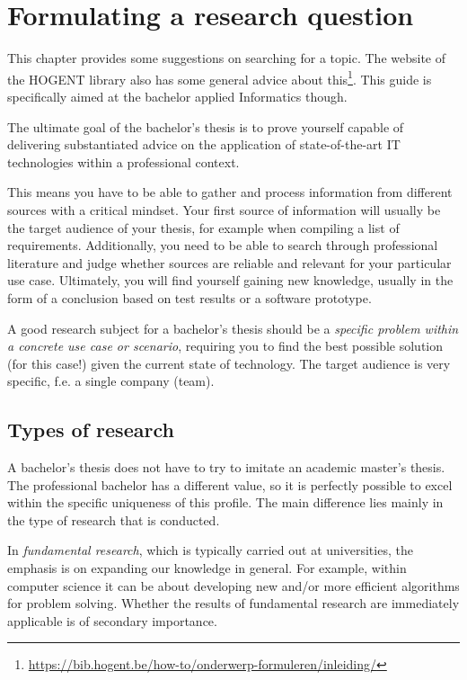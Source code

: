 \chapter{Formulating a research question}
\label{ch:researchquestion}

This chapter provides some suggestions on searching for a topic. The website of the HOGENT library also has some general advice about this\footnote{\url{https://bib.hogent.be/how-to/onderwerp-formuleren/inleiding/}}. This guide is specifically aimed at the bachelor applied Informatics though.

The ultimate goal of the bachelor's thesis is to prove yourself capable of delivering substantiated advice on the application of state-of-the-art IT technologies within a professional context. 

This means you have to be able to gather and process information from different sources with a critical mindset. Your first source of information will usually be the target audience of your thesis, for example when compiling a list of requirements. Additionally, you need to be able to search through professional literature and judge whether sources are reliable and relevant for your particular use case. Ultimately, you will find yourself gaining new knowledge, usually in the form of a conclusion based on test results or a software prototype.

A good research subject for a bachelor's thesis should be a \emph{specific problem within a concrete use case or scenario}, requiring you to find the best possible solution (for this case!) given the current state of technology. The target audience is very specific, f.e. a single company (team).

\section{Types of research}
\label{sec:researchtypes}

A bachelor's thesis does not have to try to imitate an academic master's thesis. The professional bachelor has a different value, so it is perfectly possible to excel within the specific uniqueness of this profile. The main difference lies mainly in the type of research that is conducted.

In \emph{fundamental research}, which is typically carried out at universities, the emphasis is on expanding our knowledge in general. For example, within computer science it can be about developing new and/or more efficient algorithms for problem solving. Whether the results of fundamental research are immediately applicable is of secondary importance.

